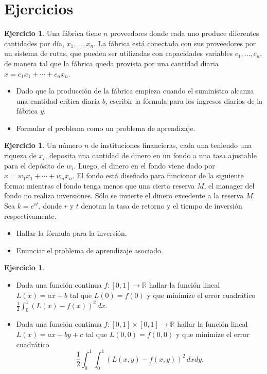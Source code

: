 \documentclass[12pt, a4paper]{amsbook}
\newcommand{\R}{{\mathbb R}}
\theoremstyle{remark}
\theoremstyle{definition}
\newtheorem{ejer}[teo]{Ejercicio}
\numberwithin{section}{chapter}
\numberwithin{subsection}{section}
\numberwithin{equation}{section}
\numberwithin{figure}{chapter}
\begin{document}
\section{Ejercicios}\label{sec.c1.5}

\begin{ejer}
Una fábrica tiene $n$ proveedores donde cada uno produce diferentes cantidades por día, $x_1,\dots,x_n$. La fábrica está conectada con sus proveedores por un sistema de rutas, que pueden ser utilizadas con capacidades variables $c_1,\dots,c_n$, de manera tal que la fábrica queda provista por una cantidad diaria $x=c_1 x_1 + \cdots + c_n x_n$.
\begin{itemize}
\item[(a)] Dado que la producción de la fábrica empieza cuando el suministro alcanza una cantidad crítica diaria $b$, escribir la fórmula para los ingresos diarios de la fábrica $y$.
\item[(b)] Formular el problema como un problema de aprendizaje.
\end{itemize}
\end{ejer}

\begin{ejer}
Un número $n$ de instituciones financieras, cada una teniendo una riqueza de $x_i$, deposita una cantidad de dinero en un fondo a una tasa ajustable para el depósito de $w_i$. Luego, el dinero en el fondo viene dado por $x=w_1 x_1 + \cdots + w_n x_n$. El fondo está diseñado para funcionar de la siguiente forma: mientras el fondo tenga menos que una cierta reserva $M$, el manager del fondo no realiza inversiones. Sólo se invierte el dinero excedente a la reserva $M$. Sea $k=e^{rt}$, donde $r$ y $t$ denotan la tasa de retorno y el tiempo de inversión respectivamente.
\begin{itemize}
\item[(a)] Hallar la fórmula para la inversión.
\item [(b)] Enunciar el problema de aprendizaje asociado.
\end{itemize}
\end{ejer}

\begin{ejer}
\begin{itemize}
\item[(a)] Dada una función continua $f\colon [0,1]\to \R$ hallar la función lineal $L(x)=ax+b$ tal que $L(0)=f(0)$ y que minimize el error cuadrático $\frac12 \int_0^1(L(x)-f(x))^2\, dx$.

\item[(b)] Dada una función continua $f\colon [0,1]\times [0,1]\to \R$ hallar la función lineal $L(x)=ax+by+c$ tal que $L(0,0)=f(0,0)$ y que minimize el error cuadrático 
$$\frac12 \int_0^1\int_0^1 (L(x,y)-f(x,y))^2\, dxdy.$$
\end{itemize}
\end{ejer}
\end{document}
